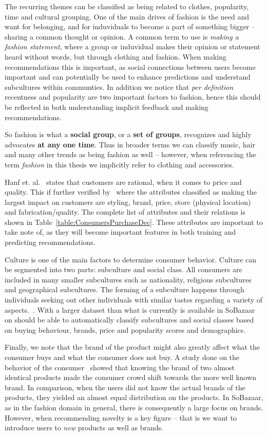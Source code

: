 The recurring themes can be classified as being related to clothes, popularity,
time and cultural grouping. One of the main drives of fashion is the need and
want for belonging, and for induviduals to become a part of something bigger
– sharing a common thought or opinion. A common term to use is \textit{making a
fashion statement}, where a group or induvidual makes their opinion or
statement heard without words, but through clothing and fashion. When making
recommendations this is important, as social connections between users become
important and can potentially be used to enhance predictions and understand
subcultures within communties. In addition we notice that \textit{per
definition} recentness and popularity are two important factors to fashion,
hence this should be reflected in both understanding implicit feedback and
making recommendations.

So fashion is what a \textbf{social group}, or a \textbf{set of groups},
recognizes and highly advocates \textbf{at any one time}. Thus in broader
terms we can classify music, hair and many other trends as being fashion as
well – however, when referencing the term \textit{fashion} in this thesis we
implicitly refer to clothing and accessories.

Hanf et. al.~\cite{Hanf1994} states that customers are rational, when it comes
to price and quality. This if further verified by~\cite{dutton2006} where the
attributes classified as making the largest impact on customers are styling,
brand, price, store (physical location) and fabrication/quality. The complete
list of attributes and their relations is shown in
Table~\ref{table:ConsumersPurchaseDec}. These attributes are important to take
note of, as they will become important features in both training and predicting
recommendations.
  
Culture is one of the main factors to determine consumer behavior.  Culture can
be segmented into two parts: subculture and social class. All consumers are
included in many smaller subcultures such as nationality, religious subcultures
and geographical subcultures. The forming of a subculture happens through
individuals seeking out other individuals with similar tastes regarding a
variety of aspects.~\cite{vignali2009fashion}. With a larger dataset than what
is currently is available in SoBazaar on should be able to automatically
classify subcultures and social classes based on buying behaviour, brands,
price and popularity scores and demographics.

Finally, we note that the brand of the product might also greatly affect what
the consumer buys and what the consumer does not buy. A study done on the
behavior of the consumer~\cite{deLace2010} showed that knowing the brand of two
almost identical products made the consumer crowd shift towards the more well
known brand. In comparison, when the users did not know the actual brands of
the products, they yielded an almost equal distribution on the products. In
SoBazaar, as in the fashion domain in general, there is consequently a large
focus on brands. However, when recommending novelty is a key figure – that is
we want to introduce users to \textit{new} products as well as brands.

